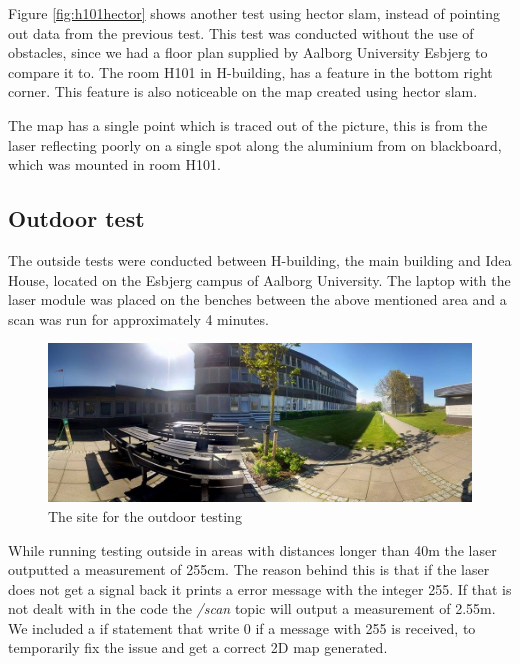 Figure \ref{fig:h101hector} shows another test using hector slam, instead of pointing out data from the previous test. This test was conducted without the use of obstacles, since we had a floor plan supplied by Aalborg University Esbjerg to compare it to. The room H101 in H-building, has a feature in the bottom right corner. This feature is also noticeable on the map created using hector slam.

The map has a single point which is traced out of the picture, this is from the laser reflecting poorly on a single spot along the aluminium from on blackboard, which was mounted in room H101.

\subsection{Outdoor test}
The outside tests were conducted between H-building, the main building and Idea House, located on the Esbjerg campus of Aalborg University. The laptop with the laser module was placed on the benches between the above mentioned area and a scan was run for approximately 4 minutes.

\begin{figure}[H]
	\centering
	\includegraphics[width=1\linewidth]{images/lidar_outside_site.jpg}
	\caption{The site for the outdoor testing}
	\label{fig:outsideslam}
\end{figure}

While running testing outside in areas with distances longer than 40m the laser outputted a measurement of 255cm. The reason behind this is that if the laser does not get a signal back it prints a error message with the integer 255. If that is not dealt with in the code the \textit{/scan} topic will output a measurement of 2.55m. We included a if statement that write 0 if a message with 255 is received, to temporarily fix the issue and get a correct 2D map generated. 

